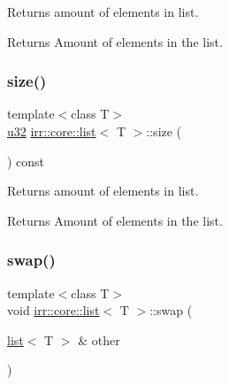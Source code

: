 Returns amount of elements in list. 

\begin{DoxyReturn}{Returns}
Amount of elements in the list. 
\end{DoxyReturn}
\mbox{\label{classirr_1_1core_1_1list_a374ab663f2439599a6b99b47a31e793d}} 
\subsubsection{\texorpdfstring{size()}{size()}\hspace{0.1cm}{\footnotesize\ttfamily [2/2]}}
{\footnotesize\ttfamily template$<$class T$>$ \\
\hyperlink{namespaceirr_a0416a53257075833e7002efd0a18e804}{u32} \hyperlink{classirr_1_1core_1_1list}{irr\+::core\+::list}$<$ T $>$\+::size (\begin{DoxyParamCaption}{ }\end{DoxyParamCaption}) const\hspace{0.3cm}{\ttfamily [inline]}}



Returns amount of elements in list. 

\begin{DoxyReturn}{Returns}
Amount of elements in the list. 
\end{DoxyReturn}
\mbox{\label{classirr_1_1core_1_1list_a860e4dab70f2ac5f13b9385f7f63d5b9}} 
\subsubsection{\texorpdfstring{swap()}{swap()}\hspace{0.1cm}{\footnotesize\ttfamily [1/2]}}
{\footnotesize\ttfamily template$<$class T$>$ \\
void \hyperlink{classirr_1_1core_1_1list}{irr\+::core\+::list}$<$ T $>$\+::swap (\begin{DoxyParamCaption}\item[{\hyperlink{classirr_1_1core_1_1list}{list}$<$ T $>$ \&}]{other }\end{DoxyParamCaption})\hspace{0.3cm}{\ttfamily [inline]}}



